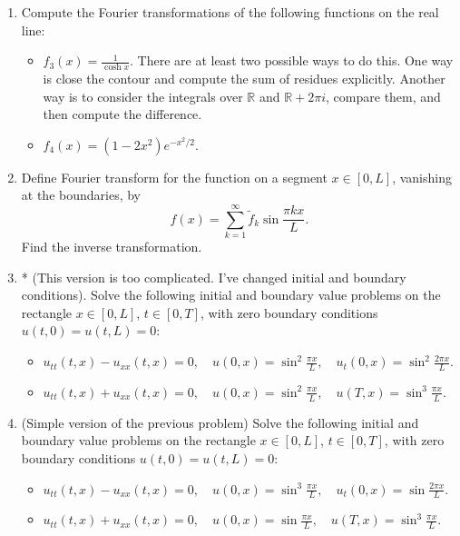 \documentclass[a4paper,11pt]{article}
\begin{document}
\begin{enumerate}
\item\label{item:8} Compute the Fourier transformations of the following functions on the real line:

\begin{itemize}
\item \(f_3(x)=\frac1{\cosh x}\). There are at least two possible ways to do this. One way is close the contour and compute the sum of residues explicitly. Another way is to consider the integrals over \(\mathbb{R}\) and \(\mathbb{R}+2\pi i\), compare them, and then compute the difference.
\item \(f_4(x)=(1-2 x^2) e^{-x^2/2}\).
\end{itemize}

\item\label{item:9} Define Fourier transform for the function on a segment \(x\in [0,L]\), vanishing at the boundaries, by
\begin{equation*}
f(x)=\sum_{k=1}^{\infty}\tilde{f}_k\sin \frac{\pi kx}{L}.
\end{equation*}
Find the inverse transformation.

\item\label{item:10} * (This version is too complicated. I've changed initial and boundary conditions). Solve the following initial and boundary value problems on the rectangle \(x\in [0,L]\), \(t\in [0,T]\), with zero boundary conditions \(u(t,0)=u(t,L)=0\):

\begin{itemize}
\item 
\(
u_{tt}(t,x)-u_{xx}(t,x)=0, \quad u(0,x)=\sin^2 \frac{\pi x}{L}, \quad u_t(0,x)= \sin^2 \frac{2\pi x}{L}.
\)
\item 
\(
u_{tt}(t,x)+u_{xx}(t,x)=0,\quad u(0,x)=\sin^2 \frac{\pi x}{L}, \quad u(T,x)=\sin^3 \frac{\pi x}{L}.
\)
\end{itemize}

\item\label{item:11} (Simple version of the previous problem) Solve the following initial and boundary value problems on the rectangle \(x\in [0,L]\), \(t\in [0,T]\), with zero boundary conditions \(u(t,0)=u(t,L)=0\):

\begin{itemize}
\item 
\(
u_{tt}(t,x)-u_{xx}(t,x)=0, \quad u(0,x)=\sin^3 \frac{\pi x}{L}, \quad u_t(0,x)= \sin \frac{2\pi x}{L}.
\)
\item 
\(
u_{tt}(t,x)+u_{xx}(t,x)=0,\quad u(0,x)=\sin \frac{\pi x}{L}, \quad u(T,x)=\sin^3 \frac{\pi x}{L}.
\)
\end{itemize}


\end{enumerate}
\end{document}
